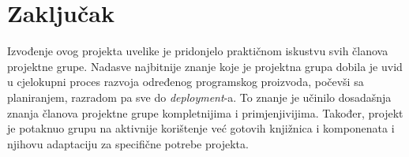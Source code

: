 		 \eject
		 
		 \section{Zaključak}
		 Izvođenje ovog projekta uvelike je pridonjelo praktičnom iskustvu svih članova projektne grupe. Nadasve najbitnije znanje koje je projektna grupa dobila je uvid u cjelokupni proces razvoja određenog programskog proizvoda, počevši sa planiranjem, razradom pa sve do \textit{deployment}-a. To znanje je učinilo dosadašnja znanja članova projektne grupe kompletnijima i primjenjivijima. Također, projekt je potaknuo grupu na aktivnije korištenje već gotovih knjižnica i komponenata i njihovu adaptaciju za specifične potrebe projekta.
		 \eject
		 
		 
		
		\eject 